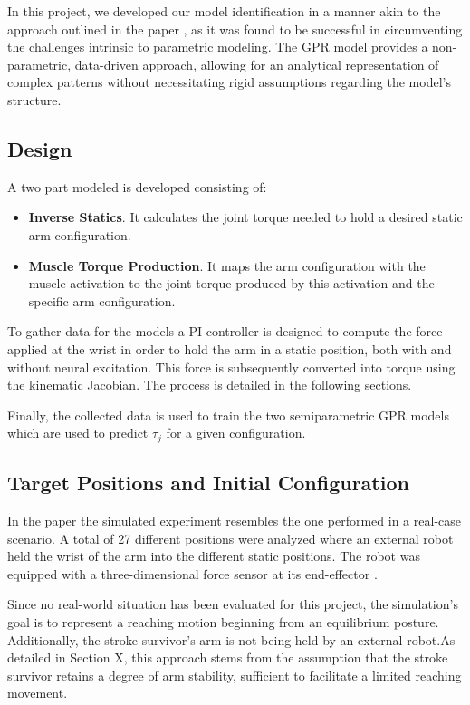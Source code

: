 In this project, we developed our model identification in a manner akin to the approach outlined in the paper \cite{QSC}, as it was found to be successful in circumventing the challenges intrinsic to parametric modeling. The GPR model provides a non-parametric, data-driven approach, allowing for an analytical representation of complex patterns without necessitating rigid assumptions regarding the model's structure.

\subsection{Design}

 A two part modeled is developed consisting of:

 \begin{itemize}
     \item \textbf{Inverse Statics}. It calculates the joint torque needed to hold a desired static arm configuration.
     \item \textbf{Muscle Torque Production}. It maps the arm configuration with the muscle activation to the joint torque produced by this activation and the specific arm configuration. 
 \end{itemize}

To gather data for the models a PI controller is designed to compute the force applied at the wrist in order to hold the arm in a static position, both with and without neural excitation. This force is subsequently converted into torque using the kinematic Jacobian. The process is detailed in the following sections. 

Finally, the collected data is used to train the two semiparametric GPR models which are used to predict $\tau_j$ for a given configuration. 

 \subsection{Target Positions and Initial Configuration}

 In the paper \cite{QSC} the simulated experiment resembles the one performed in a real-case scenario. A total of 27 different positions were analyzed where an external robot held the wrist of the arm into the different static positions. The robot was equipped with a three-dimensional force sensor at its end-effector \cite{HSAC}. 
 
 Since no real-world situation has been evaluated for this project, the simulation's goal is to represent a reaching motion beginning from an equilibrium posture. Additionally, the stroke survivor's arm is not being held by an external robot.As detailed in Section X, this approach stems from the assumption that the stroke survivor retains a degree of arm stability, sufficient to facilitate a limited reaching movement.  

